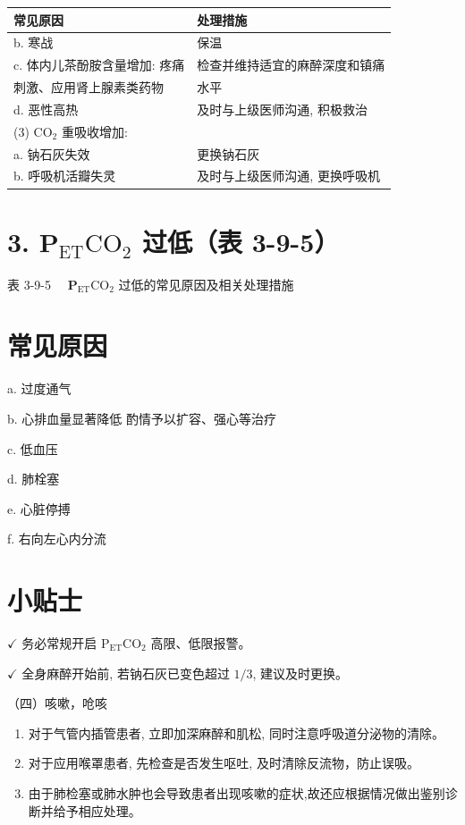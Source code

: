 \documentclass[10pt]{article}
\begin{document}
\begin{center}
\begin{tabular}{ll}
\hline
常见原因 & 处理措施 \\
\hline
b. 寒战 & 保温 \\
c. 体内儿茶酚胺含量增加: 疼痛 & 检查并维持适宜的麻醉深度和镇痛 \\
刺激、应用肾上腺素类药物 & 水平 \\
d. 恶性高热 & 及时与上级医师沟通, 积极救治 \\
(3) $\mathrm{CO}_{2}$ 重吸收增加: &  \\
a. 钠石灰失效 & 更换钠石灰 \\
b. 呼吸机活瓣失灵 & 及时与上级医师沟通, 更换呼吸机 \\
\hline
\end{tabular}
\end{center}

\section*{3. $\mathbf{P}_{\mathrm{ET}} \mathrm{CO}_{2}$ 过低（表 3-9-5）}
表 3-9-5 $\quad \mathbf{P}_{\mathrm{ET}} \mathrm{CO}_{2}$ 过低的常见原因及相关处理措施

\section*{常见原因}
a. 过度通气

b. 心排血量显著降低 酌情予以扩容、强心等治疗

c. 低血压

d. 肺栓塞

e. 心脏停搏

f. 右向左心内分流

\section*{小贴士}
$\checkmark$ 务必常规开启 $\mathrm{P}_{\mathrm{ET}} \mathrm{CO}_{2}$ 高限、低限报警。

$\checkmark$ 全身麻醉开始前, 若钠石灰已变色超过 $1 / 3$, 建议及时更换。

（四）咳嗽，呛咳

\begin{enumerate}
  \item 对于气管内插管患者, 立即加深麻醉和肌松, 同时注意呼吸道分泌物的清除。

  \item 对于应用喉罩患者, 先检查是否发生呕吐, 及时清除反流物，防止误吸。

  \item 由于肺检塞或肺水肿也会导致患者出现咳嗽的症状,故还应根据情况做出鉴别诊断并给予相应处理。

\end{enumerate}
\end{document}
